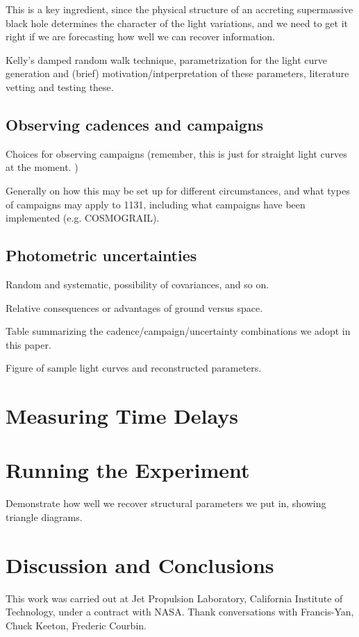 \documentclass{emulateapj}
\begin{document}
This is a key ingredient, since the physical structure of an accreting supermassive black hole determines the character of the light variations, and we need to get it right if we are forecasting how well we can recover information. 

Kelly's damped random walk technique, parametrization for the light curve generation and (brief) motivation/intperpretation of these parameters, literature vetting and testing these. 
\subsection{Observing cadences and campaigns}\label{}

Choices for observing campaigns (remember, this is just for straight light curves at the moment. )

Generally on how this may be set up for different circumstances, and what types of campaigns may apply to 1131, including what campaigns have been implemented (e.g. COSMOGRAIL). 

\subsection{Photometric uncertainties}\label{}

Random and systematic, possibility of covariances, and so on.  

Relative consequences or advantages of ground versus space. 

Table summarizing the cadence/campaign/uncertainty combinations we adopt in this paper. 

Figure of sample light curves and reconstructed parameters. 


\section{Measuring Time Delays}



\section{Running the Experiment}\label{}

Demonstrate how well we recover structural parameters we put in, showing triangle diagrams.

\section{Discussion and Conclusions}\label{sec:disc}

\acknowledgements

This work was carried out at Jet Propulsion Laboratory, California
Institute of Technology, under a contract with NASA.  Thank conversations with Francis-Yan, Chuck Keeton, Frederic Courbin. 



\end{document}
